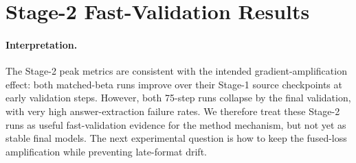 \section{Stage-2 Fast-Validation Results}
\label{sec:stage2-results}

\begin{table}[t]
\centering
\small
\setlength{\tabcolsep}{4.2pt}
\renewcommand{\arraystretch}{1.15}
\caption{Stage-2 fast-validation results. Both runs use Model2-policy rollout and fused-policy loss. Values are online validation percentages. ``Best checkpoint step'' is selected by MATH-500 mean@3; rows labeled ``Best'' report each metric's own peak over validation steps; ``Final'' is the step-75 validation.}
\label{tab:stage2-fast-validation}
\end{table}

\paragraph{Interpretation.}
The Stage-2 peak metrics are consistent with the intended gradient-amplification
effect: both matched-beta runs improve over their Stage-1 source checkpoints at
early validation steps. However, both 75-step runs collapse by the final
validation, with very high answer-extraction failure rates. We therefore treat
these Stage-2 runs as useful fast-validation evidence for the method mechanism,
but not yet as stable final models. The next experimental question is how to
keep the fused-loss amplification while preventing late-format drift.

